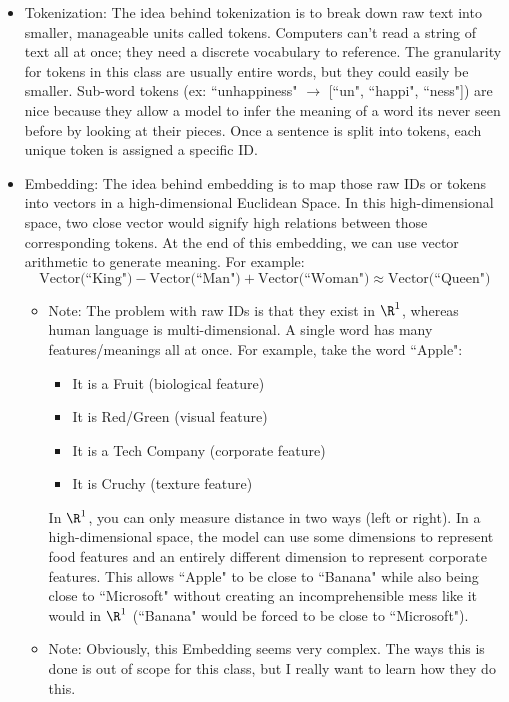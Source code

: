 \documentclass[12pt]{article}
\begin{document}
\begin{itemize}
	\item Tokenization: The idea behind tokenization is to break down raw text into smaller, manageable units called tokens. Computers can't read a string of text all at once; they need a discrete vocabulary to reference. The granularity for tokens in this class are usually entire words, but they could easily be smaller. Sub-word tokens (ex: ``unhappiness" $\rightarrow$ [``un", ``happi", ``ness"]) are nice because they allow a model to infer the meaning of a word its never seen before by looking at their pieces. Once a sentence is split into tokens, each unique token is assigned a specific ID.
	\item Embedding: The idea behind embedding is to map those raw IDs or tokens into vectors in a high-dimensional Euclidean Space. In this high-dimensional space, two close vector would signify high relations between those corresponding tokens. At the end of this embedding, we can use vector arithmetic to generate meaning. For example:
		$$\text{Vector(``King")} - \text{Vector(``Man")} + \text{Vector(``Woman")} \approx \text{Vector(``Queen")}$$
		\begin{itemize}
			\item Note: The problem with raw IDs is that they exist in $\R^1$, whereas human language is multi-dimensional. A single word has many features/meanings all at once. For example, take the word ``Apple":
				\begin{itemize}
					\item It is a Fruit (biological feature)
					\item It is Red/Green (visual feature)
					\item It is a Tech Company (corporate feature)
					\item It is Cruchy (texture feature)
				\end{itemize}
				In $\R^1$, you can only measure distance in two ways (left or right). In a high-dimensional space, the model can use some dimensions to represent food features and an entirely different dimension to represent corporate features. This allows ``Apple" to be close to ``Banana" while also being close to ``Microsoft" without creating an incomprehensible mess like it would in $\R^1$ (``Banana" would be forced to be close to ``Microsoft").
			\item Note: Obviously, this Embedding seems very complex. The ways this is done is out of scope for this class, but I really want to learn how they do this.
		\end{itemize}
\end{itemize}
\end{document}
